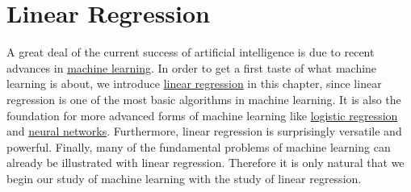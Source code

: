 \chapter{Linear Regression}
A great deal of the current success of artificial intelligence is due to recent advances in
\href{https://en.wikipedia.org/wiki/Machine_learning}{machine learning}.  
In order to get a first taste of what machine learning is about, we introduce 
\href{https://en.wikipedia.org/wiki/Linear_regression}{linear regression} 
in this chapter, since linear regression
is one of the most basic algorithms in machine learning.  It is also the foundation for more advanced
forms of machine learning like \href{https://en.wikipedia.org/wiki/Logistic_regression}{logistic regression} and 
\href{https://en.wikipedia.org/wiki/Artificial_neural_network}{neural networks}.
Furthermore, linear regression is surprisingly versatile and powerful.  Finally, many of the fundamental problems of machine
learning can already be illustrated with linear regression.  Therefore it is only natural that we begin our
study of machine learning with the study of linear regression.

